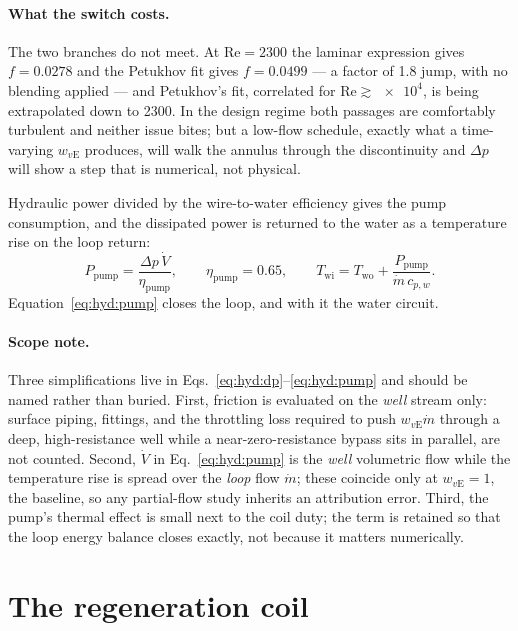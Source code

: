 \documentclass[11pt]{article}
\newcommand{\md}{\ensuremath{\dot m}}
\begin{document}
\paragraph{What the switch costs.} The two branches do not meet. At $\mathrm{Re}=2300$ the
laminar expression gives $f=\num{0.0278}$ and the Petukhov fit gives $f=\num{0.0499}$ --- a
factor of \num{1.8} jump, with no blending applied --- and Petukhov's fit, correlated for
$\mathrm{Re}\gtrsim\num{e4}$, is being extrapolated down to \num{2300}. In the design regime
both passages are comfortably turbulent and neither issue bites; but a low-flow schedule,
exactly what a time-varying $w_{v\mathrm{E}}$ produces, will walk the annulus through the
discontinuity and $\Delta p$ will show a step that is numerical, not physical.

Hydraulic power divided by the wire-to-water efficiency gives the pump consumption, and the
dissipated power is returned to the water as a temperature rise on the loop return:
\begin{equation}
P_{\mathrm{pump}}=\frac{\Delta p\,\dot V}{\eta_{\mathrm{pump}}},
\qquad \eta_{\mathrm{pump}}=\num{0.65},
\qquad
T_{\mathrm{wi}}=T_{\mathrm{wo}}+\frac{P_{\mathrm{pump}}}{\md\,c_{p,w}} .
\label{eq:hyd:pump}
\end{equation}
Equation~\eqref{eq:hyd:pump} closes the loop, and with it the water circuit.

\paragraph{Scope note.} Three simplifications live in
Eqs.~\eqref{eq:hyd:dp}--\eqref{eq:hyd:pump} and should be named rather than buried. First,
friction is evaluated on the \emph{well} stream only: surface piping, fittings, and the
throttling loss required to push $w_{v\mathrm{E}}\md$ through a deep, high-resistance well
while a near-zero-resistance bypass sits in parallel, are not counted. Second, $\dot V$ in
Eq.~\eqref{eq:hyd:pump} is the \emph{well} volumetric flow while the temperature rise is spread
over the \emph{loop} flow $\md$; these coincide only at $w_{v\mathrm{E}}=1$, the baseline, so
any partial-flow study inherits an attribution error. Third, the pump's thermal effect is small
next to the coil duty; the term is retained so that the loop energy balance closes exactly, not
because it matters numerically.

\section{The regeneration coil}
\label{sec:hyd:coil}
\end{document}
